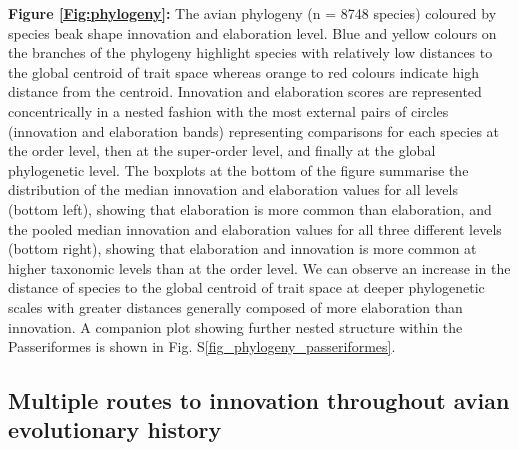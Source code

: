 \documentclass[12pt,letterpaper]{article}
\begin{document}
\noindent \textbf{Figure \ref{Fig:phylogeny}:} The avian phylogeny (n = 8748 species) coloured by species beak shape innovation and elaboration level.
Blue and yellow colours on the branches of the phylogeny highlight species with relatively low distances to the global centroid of trait space whereas orange to red colours indicate high distance from the centroid.
Innovation and elaboration scores are represented concentrically in a nested fashion with the most external pairs of circles (innovation and elaboration bands) representing comparisons for each species at the order level, then at the super-order level, and finally at the global phylogenetic level.
The boxplots at the bottom of the figure summarise the distribution of the median innovation and elaboration values for all levels (bottom left), showing that elaboration is more common than elaboration,
and the pooled median innovation and elaboration values for all three different levels (bottom right), showing that elaboration and innovation is more common at higher taxonomic levels than at the order level.
We can observe an increase in the distance of species to the global centroid of trait space at deeper phylogenetic scales with greater distances generally composed of more elaboration than innovation.
A companion plot showing further nested structure within the Passeriformes is shown in Fig. S\ref{fig_phylogeny_passeriformes}. 

\subsection{Multiple routes to innovation throughout avian evolutionary history}
\end{document}
